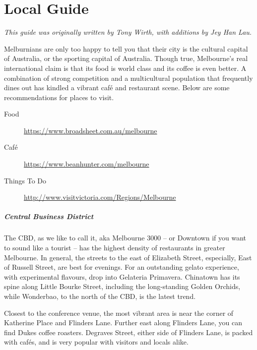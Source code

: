 \chapter{Local Guide}

\emph{This guide was originally written by Tony Wirth, with additions by 
  Jey Han Lau.}

Melburnians are only too happy to tell you that their city is the cultural
capital of Australia, or the sporting capital of Australia.
Though true, Melbourne's real international claim is that its food is 
world class and its coffee is even better.
A combination of strong competition and a multicultural
population that frequently dines out
has kindled a vibrant caf{\'e} and restaurant scene.
Below are some recommendations for places to visit.

\begin{description}
\item[Food] \url{https://www.broadsheet.com.au/melbourne}
\item[Caf{\'e}] \url{https://www.beanhunter.com/melbourne}
\item[Things To Do] \url{http://www.visitvictoria.com/Regions/Melbourne}
\end{description}



\paragraph{Central Business District}

The CBD, as we like to call it, aka Melbourne 3000 -- or Downtown if you want to
sound like a tourist -- has the highest density of restaurants in 
greater Melbourne. In general, the streets to the east of Elizabeth 
Street, especially, East of Russell Street, are best for evenings.
For an outstanding gelato experience, with experimental flavours, drop 
into Gelateria Primavera. Chinatown has its spine along Little Bourke 
Street, including the long-standing Golden Orchids, while Wonderbao, to 
the north of the CBD, is the latest trend.

Closest to the conference venue,
the most vibrant area
is near the corner of
Katherine Place and Flinders Lane.
Further east along Flinders Lane,
you can find Dukes coffee roasters.
Degraves Street, either side of Flinders Lane, is packed with caf{\'e}s,
and is very popular with visitors and locals alike.

